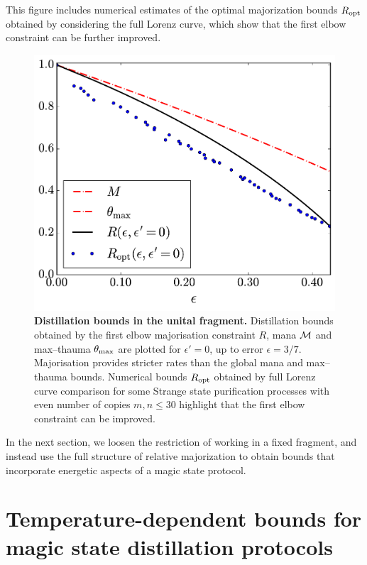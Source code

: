 \documentclass[pra,
aps,
twocolumn,
superscriptaddress,
groupedaddress,
nofootinbib,
reprint
]{revtex4-1}
\begin{document}
This figure includes numerical estimates of the optimal majorization bounds $R_{\rm{opt}}$ obtained by considering the full Lorenz curve, which show that the first elbow constraint can be further improved.
\begin{figure}[t]
    \centering
    \includegraphics[scale=0.35]{figs/distill_bounds.pdf}
    \caption{\textbf{Distillation bounds in the unital fragment.} Distillation bounds obtained by the first elbow majorisation constraint $R$, mana ${\mathcal M}$ and max--thauma $\theta_{\rm{max}}$ are plotted for $\epsilon' = 0$, up to error $\epsilon = 3/7$.
    Majorisation provides stricter rates than the global mana and max--thauma bounds.
    Numerical bounds $R_{\rm{opt}}$ obtained by full Lorenz curve comparison for some Strange state purification processes with even number of copies $m,n \leq 30$ highlight that the first elbow constraint can be improved.
    }
    \label{fig:distill_bounds}
\end{figure}

In the next section, we loosen the restriction of working in a fixed fragment, and instead use the full structure of relative majorization to obtain bounds that incorporate energetic aspects of a magic state protocol.

\newpage
\section{Temperature-dependent bounds for magic state distillation protocols}
\label{sec:stab}
\end{document}
